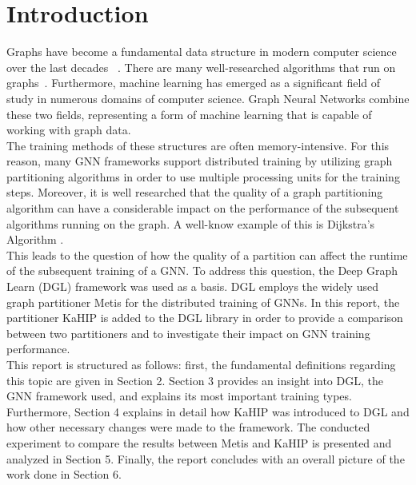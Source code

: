 \documentclass[acmsmall,nonacm,screen,review]{acmart}
\begin{document}
\section{Introduction}
Graphs have become a fundamental data structure in modern computer science over the last decades ~\cite{Junghanns2017}. There are many well-researched algorithms that run on \hbox{graphs \cite{Color,SP,Flow}}. Furthermore, machine learning has emerged as a significant field of study in numerous domains of computer science. Graph Neural Networks combine these two fields, representing a form of machine learning that is capable of working with graph data. \\
The training methods of these structures are often memory-intensive. For this reason, many GNN frameworks support distributed training by utilizing graph partitioning algorithms in order to use multiple processing units for the training steps. Moreover, it is well researched that the quality of a graph partitioning algorithm can have a considerable impact on the performance of the subsequent algorithms running on the graph. A well-know example of this is Dijkstra’s Algorithm \cite{DBLP:journals/jea/MohringSSWW06}.\\
This leads to the question of how the quality of a partition can affect the runtime of the subsequent training of a GNN. To address this question, the Deep Graph Learn (DGL) framework \cite{DGL} was used as a basis. DGL employs the widely used graph partitioner Metis \cite{Metis} for the distributed training of GNNs. In this report, the partitioner KaHIP \cite{KaHIP} is added to the DGL library in order to provide a comparison between two partitioners and to investigate their impact on GNN training performance. \\  
This report is structured as follows: first, the fundamental definitions regarding this topic are given in Section 2. Section 3 provides an insight into DGL, the GNN framework used, and explains its most important training types. Furthermore, Section 4 explains in detail how KaHIP was introduced to DGL and how other necessary changes were made to the framework. The conducted experiment to compare the results between Metis and KaHIP is presented and analyzed in Section 5. Finally, the report concludes with an overall picture of the work done in Section 6. 
\end{document}
